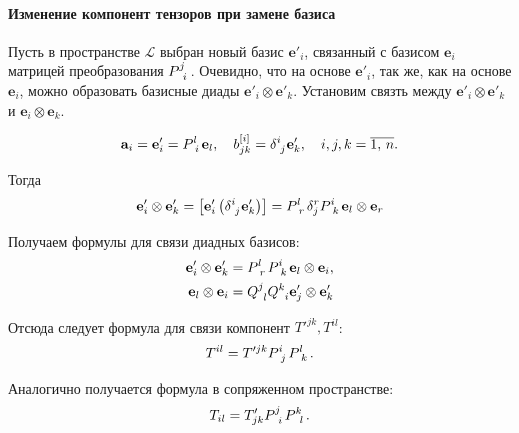 
\paragraph{Изменение компонент тензоров при замене базиса}

Пусть в пространстве $\mathcal{L}$ выбран новый базис $\mathbf{e}'_i$, связанный с базисом $\mathbf{e}_i$ матрицей преобразования $\tensor{P}{^j_i}$. Очевидно, что на основе $\mathbf{e}'_i$, так же, как на основе $\mathbf{e}_i$, можно образовать базисные диады $\mathbf{e}'_i\otimes\mathbf{e}'_k$. Установим связть между $\mathbf{e}'_i\otimes\mathbf{e}'_k$ и $\mathbf{e}_i\otimes\mathbf{e}_k$.

\begin{equation*}
	\mathbf{a}_i = \mathbf{e}'_i = \tensor{P}{^l_i}\mathbf{e}_l,\quad b^{[i]}_{jk}=\tensor{\delta}{^i_j}\mathbf{e}'_k,\quad i,j,k=\overline{1,\,n}.
\end{equation*}

Тогда
\begin{equation*}
	\mathbf{e}'_i\otimes\mathbf{e}'_k = \left[\mathbf{e}'_i\left(\tensor{\delta}{^i_j}\mathbf{e}'_k\right)\right] = \tensor{P}{^l_r}\delta^r_j\tensor{P}{^i_k}\mathbf{e}_l\otimes\mathbf{e}_r
\end{equation*}

Получаем формулы для связи диадных базисов:
\begin{align*}
	\mathbf{e}'_i\otimes\mathbf{e}'_k &= \tensor{P}{^l_r}\tensor{P}{^i_k}\mathbf{e}_l\otimes\mathbf{e}_i,\\
	\mathbf{e}_l\otimes\mathbf{e}_i &= \tensor{Q}{^j_l}\tensor{Q}{^k_i}\mathbf{e}'_j\otimes\mathbf{e}'_k
\end{align*}

Отсюда следует формула для связи компонент $T'^{jk}, T^{il}$:
\begin{equation*}
	T^{il} = T'^{jk}\tensor{P}{^i_j}\tensor{P}{^l_k}.
\end{equation*}

Аналогично получается формула в сопряженном пространстве:
\begin{equation*}
	T_{il} = T'_{jk}\tensor{P}{^j_i}\tensor{P}{^k_l}.
\end{equation*}

